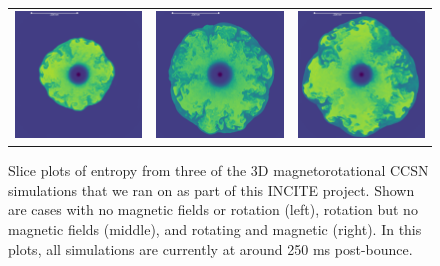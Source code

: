 \documentclass[12pt]{article}
\begin{document}
\begin{figure}[b!]
    \begin{tabular}{ccc}
        \includegraphics[width=2in]{m15u_3d_entr_slice_1126.png}&
        \includegraphics[width=2in]{m15u_3d_rot_entr_slice_1015.png}&
        \includegraphics[width=2in]{m15u_3d_mag_rot_entr_slice_1136.png}        
    \end{tabular}
    \caption{Slice plots of entropy from three of the 3D magnetorotational CCSN simulations that we ran on \mira as part of this INCITE project. Shown are cases with no magnetic fields or rotation (left), rotation but no magnetic fields (middle), and rotating and magnetic (right). In this plots, all simulations are currently at around 250 ms post-bounce.}
    \label{f.m15u}
\end{figure}
\end{document}
